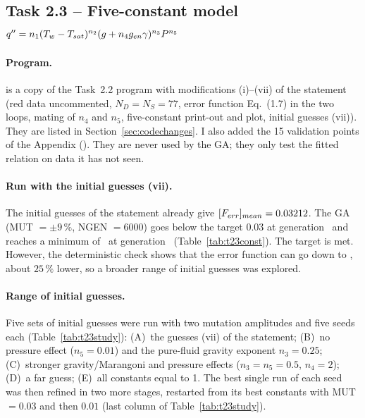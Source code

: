 \subsection{Task 2.3 -- Five-constant model $q''=n_1(T_w-T_{sat})^{n_2}(g+n_4g_{en}\gamma)^{n_3}P^{n_5}$}
\label{sec:t23}

\paragraph{Program.}
 is a copy of the Task~2.2 program with modifications (i)--(vii) of the
statement (red data uncommented, $N_D=N_S=77$, error function Eq.~(1.7) in the two loops, mating of
$n_4$ and $n_5$, five-constant print-out and plot, initial guesses (vii)). They are listed in
Section~\ref{sec:codechanges}. I also added the 15 validation points of the Appendix ().
They are never used by the GA; they only test the fitted relation on data it has not seen.

\paragraph{Run with the initial guesses (vii).}
The initial guesses of the statement already give $[F_{err}]_{mean}=0.03212$. The GA (MUT $=\pm9\,\%$,
NGEN $=6000$) goes below the target 0.03 at generation \TwoThreeBaseKconv\ and reaches a minimum of
\TwoThreeBaseF\ at generation \TwoThreeBaseKmin\ (Table~\ref{tab:t23const}). The target is met. However,
the deterministic check shows that the error function can go down to \TwoThreeRefF, about $25\,\%$
lower, so a broader range of initial guesses was explored.

\paragraph{Range of initial guesses.}
Five sets of initial guesses were run with two mutation amplitudes and five seeds each
(Table~\ref{tab:t23study}):
(A)~the guesses (vii) of the statement;
(B)~no pressure effect ($n_5=0.01$) and the pure-fluid gravity exponent $n_3=0.25$;
(C)~stronger gravity/Marangoni and pressure effects ($n_3=n_5=0.5$, $n_4=2$);
(D)~a far guess;
(E)~all constants equal to 1.
The best single run of each seed was then refined in two more stages, restarted from its best constants
with MUT $=0.03$ and then $0.01$ (last column of Table~\ref{tab:t23study}).

\begin{table}[H]
\centering\scriptsize
\caption{Task 2.3: effect of the initial guesses (NGEN $=6000$, 5 seeds per line, 3 for MFRAC $=1$).
``frac.\ nkeep$=0$'' = fraction of generations without any survivor. ``refined'' = best and worst
$\Ferrmean$ after the two refinement stages (MUT $=0.03$ then $0.01$) for 3 seeds. Deterministic reference
minimum: $\TwoThreeRefF$.}
\label{tab:t23study}
\end{table}

